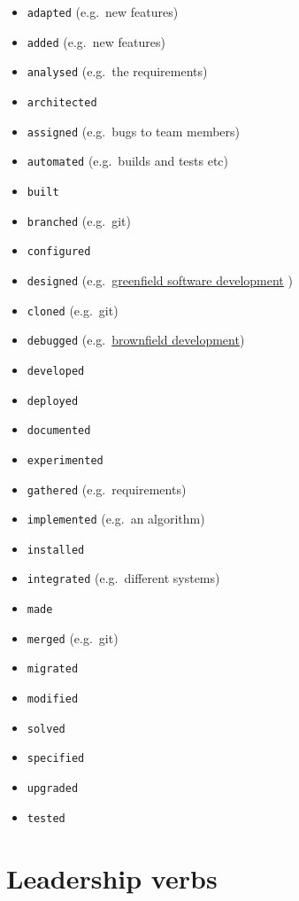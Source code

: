 \documentclass[
]{book}
\providecommand{\tightlist}{%
  \setlength{\itemsep}{0pt}\setlength{\parskip}{0pt}}
\begin{document}
\begin{itemize}
\tightlist
\item
  \texttt{adapted} (e.g.~new features)
\item
  \texttt{added} (e.g.~new features)
\item
  \texttt{analysed} (e.g.~the requirements)
\item
  \texttt{architected}
\item
  \texttt{assigned} (e.g.~bugs to team members)
\item
  \texttt{automated} (e.g.~builds and tests etc)
\item
  \texttt{built}
\item
  \texttt{branched} (e.g.~git)
\item
  \texttt{configured}
\item
  \texttt{designed} (e.g.~\href{https://en.wikipedia.org/wiki/Greenfield_project}{greenfield software development} )
\item
  \texttt{cloned} (e.g.~git)
\item
  \texttt{debugged} (e.g.~\href{https://en.wikipedia.org/wiki/Brownfield_(software_development)}{brownfield development})
\item
  \texttt{developed}
\item
  \texttt{deployed}
\item
  \texttt{documented}
\item
  \texttt{experimented}
\item
  \texttt{gathered} (e.g.~requirements)
\item
  \texttt{implemented} (e.g.~an algorithm)
\item
  \texttt{installed}
\item
  \texttt{integrated} (e.g.~different systems)
\item
  \texttt{made}
\item
  \texttt{merged} (e.g.~git)
\item
  \texttt{migrated}
\item
  \texttt{modified}
\item
  \texttt{solved}
\item
  \texttt{specified}
\item
  \texttt{upgraded}
\item
  \texttt{tested}
\end{itemize}

\hypertarget{leading}{%
\section{Leadership verbs}\label{leading}}
\end{document}
